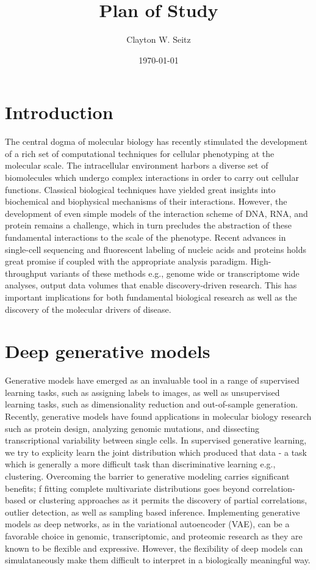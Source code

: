 \documentclass{article}
\title{Plan of Study}
\author{Clayton W. Seitz}
\date{\today}
\begin{document}
  \maketitle%
\vspace{0.4in}

\section{Introduction}

The central dogma of molecular biology has recently stimulated the development of a rich set of computational techniques for cellular phenotyping at the molecular scale. The intracellular environment harbors a diverse set of biomolecules which undergo complex interactions in order to carry out cellular functions. Classical biological techniques have yielded great insights into biochemical and biophysical mechanisms of their interactions. However, the development of even simple models of the interaction scheme of DNA, RNA, and protein remains a challenge, which in turn precludes the abstraction of these fundamental interactions to the scale of the phenotype. Recent advances in single-cell sequencing and fluorescent labeling of nucleic acids and proteins holds great promise if coupled with the appropriate analysis paradigm. High-throughput variants of these methods e.g., genome wide or transcriptome wide analyses,  output data volumes that enable discovery-driven research. This has important implications for both fundamental biological research as well as the discovery of the molecular drivers of disease.

\section{Deep generative models}

Generative models have emerged as an invaluable tool in a range of supervised learning tasks, such as assigning labels to images, as well as unsupervised learning tasks, such as
dimensionality reduction and out-of-sample generation. Recently, generative models have found applications in molecular biology research such as protein design, analyzing genomic mutations, and dissecting transcriptional variability between single cells. In supervised generative learning, we try to explicity learn the joint distribution which produced that data - a task which is generally a more difficult task than discriminative learning e.g., clustering. Overcoming the barrier to generative modeling carries significant benefits; f fitting complete multivariate distributions goes beyond correlation-based or clustering approaches as it permits the discovery of partial correlations, outlier detection, as well as sampling based inference. Implementing generative models as deep networks, as in the variational autoencoder (VAE), can be a favorable choice in genomic, transcriptomic, and proteomic research as they are known to be flexible and expressive. However, the flexibility of deep models can simulataneously make them difficult to interpret in a biologically meaningful way. 
\end{document}
